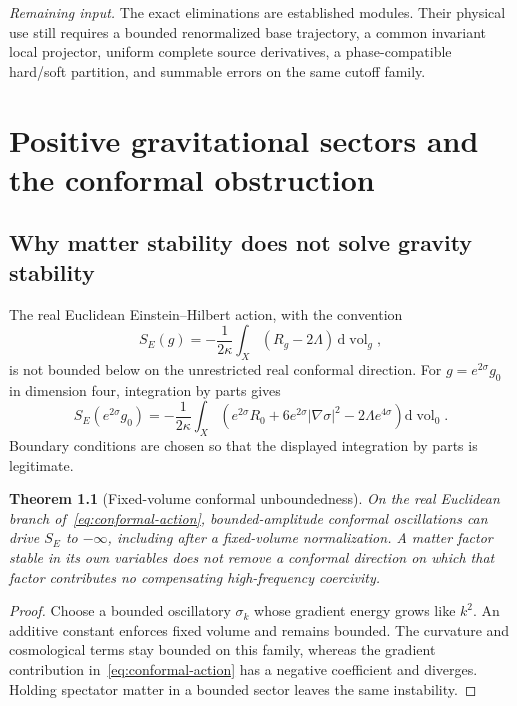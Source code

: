 \documentclass[11pt,a4paper,oneside]{book}
\theoremstyle{plain}
\newtheorem{theorem}{Theorem}[chapter]
\theoremstyle{definition}
\theoremstyle{remark}
\newcommand{\dd}{\mathrm d}
\newcommand{\vol}{\operatorname{vol}}
\newcommand{\src}[2]{\cite{#1}}
\newcommand{\gate}[1]{\par\smallskip\noindent\textit{Remaining input.} #1\par\smallskip}
\begin{document}
\gate{The exact eliminations are established modules. Their physical use still requires a bounded renormalized base trajectory, a common invariant local projector, uniform complete source derivatives, a phase-compatible hard/soft partition, and summable errors on the same cutoff family.}


\chapter{Positive gravitational sectors and the conformal obstruction}
\label{ch:positive-gravity}
\section{Why matter stability does not solve gravity stability}
The real Euclidean Einstein--Hilbert action, with the convention
\begin{equation}
 S_E(g)=-\frac1{2\kappa}\int_X(R_g-2\Lambda)\,\dd\vol_g,
\end{equation}
is not bounded below on the unrestricted real conformal direction. For $g=e^{2\sigma}g_0$ in dimension four, integration by parts gives
\begin{equation}
 S_E(e^{2\sigma}g_0)
 =-\frac1{2\kappa}\int_X
 \left(e^{2\sigma}R_0+6e^{2\sigma}|\nabla\sigma|^2
       -2\Lambda e^{4\sigma}\right)\dd\vol_0.
 \label{eq:conformal-action}
\end{equation}
Boundary conditions are chosen so that the displayed integration by parts is legitimate.

\begin{theorem}[Fixed-volume conformal unboundedness]
\label{thm:conformal}
On the real Euclidean branch of~\eqref{eq:conformal-action}, bounded-amplitude conformal oscillations can drive $S_E$ to $-\infty$, including after a fixed-volume normalization. A matter factor stable in its own variables does not remove a conformal direction on which that factor contributes no compensating high-frequency coercivity.
\end{theorem}
\begin{proof}
Choose a bounded oscillatory $\sigma_k$ whose gradient energy grows like $k^2$. An additive constant enforces fixed volume and remains bounded. The curvature and cosmological terms stay bounded on this family, whereas the gradient contribution in~\eqref{eq:conformal-action} has a negative coefficient and diverges. Holding spectator matter in a bounded sector leaves the same instability.
\end{proof}
\src{R9}{thm:n9v93-conformal-unboundedness,cor:n9v93-no-direct-EH-coercivity}
\end{document}

